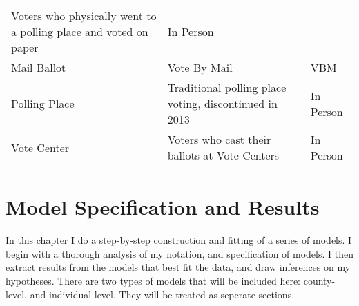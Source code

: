 \documentclass[12pt,twoside]{reedthesis}
\begin{document}
\begin{longtable}[]{@{}lll@{}}
\begin{minipage}[t]{0.63\columnwidth}
  Voters who physically went to a polling place and voted on paper\strut
  \end{minipage} & \begin{minipage}[t]{0.15\columnwidth}\raggedright\strut
  In Person\strut
  \end{minipage}\tabularnewline
  \begin{minipage}[t]{0.13\columnwidth}\raggedright\strut
  Mail Ballot\strut
  \end{minipage} & \begin{minipage}[t]{0.63\columnwidth}\raggedright\strut
  Vote By Mail\strut
  \end{minipage} & \begin{minipage}[t]{0.15\columnwidth}\raggedright\strut
  VBM\strut
  \end{minipage}\tabularnewline
  \begin{minipage}[t]{0.13\columnwidth}\raggedright\strut
  Polling Place\strut
  \end{minipage} & \begin{minipage}[t]{0.63\columnwidth}\raggedright\strut
  Traditional polling place voting, discontinued in 2013\strut
  \end{minipage} & \begin{minipage}[t]{0.15\columnwidth}\raggedright\strut
  In Person\strut
  \end{minipage}\tabularnewline
  \begin{minipage}[t]{0.13\columnwidth}\raggedright\strut
  Vote Center\strut
  \end{minipage} & \begin{minipage}[t]{0.63\columnwidth}\raggedright\strut
  Voters who cast their ballots at Vote Centers\strut
  \end{minipage} & \begin{minipage}[t]{0.15\columnwidth}\raggedright\strut
  In Person\strut
  \end{minipage}\tabularnewline
  \bottomrule
  \end{longtable}
  
  \chapter{Model Specification and
  Results}\label{model-specification-and-results}
  
  In this chapter I do a step-by-step construction and fitting of a series
  of models. I begin with a thorough analysis of my notation, and
  specification of models. I then extract results from the models that
  best fit the data, and draw inferences on my hypotheses. There are two
  types of models that will be included here: county-level, and
  individual-level. They will be treated as seperate sections.
  
\end{document}
